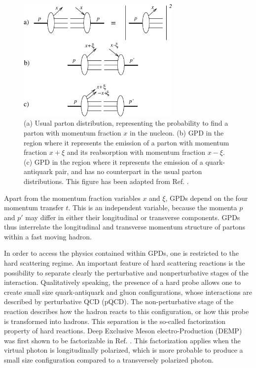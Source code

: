 \documentclass[preprint,superscriptaddress]{revtex4}
\begin{document}
\begin{figure}[hbtp!]
\includegraphics[height=6cm]{pdist_gpd_comparo.eps}
\caption{\label{fig:pdis_gpd_comparo}
(a) Usual parton distribution, representing the probability to find a parton
with momentum fraction $x$ in the nucleon.
(b) GPD in the region where it represents the emission of a parton with
momentum fraction $x+\xi$ and its reabsorption with momentum fraction $x-\xi$.
(c) GPD in the region where it represents the emission of a quark-antiquark
pair, and has no counterpart in the usual parton distributions.
This figure has been adapted from Ref. \cite{Di00}.
}
\end{figure}

Apart from the momentum fraction variables $x$ and $\xi$, GPDs depend on the
four momentum transfer $t$.  This is an independent variable, because the
momenta $p$ and $p'$ may differ in either their longitudinal or transverse
components.  GPDs thus interrelate the longitudinal and transverse momentum
structure of partons within a fast moving hadron.

In order to access the physics contained within GPDs, one is restricted to the
hard scattering regime.  An important feature of hard scattering reactions is
the possibility to separate clearly the perturbative and nonperturbative stages
of the interaction.  Qualitatively speaking, the presence of a hard probe
allows one to create small size quark-antiquark and gluon configurations, whose
interactions are described by perturbative QCD (pQCD).  The non-perturbative
stage of the reaction describes how the hadron reacts to this configuration, or
how this probe is transformed into hadrons.  This separation is the so-called
factorization property of hard reactions.  Deep Exclusive Meson
electro-Production (DEMP) was first shown to be factorizable in
Ref. \cite{Co97}.  This factorization applies when the virtual photon is
longitudinally polarized, which is more probable to produce a small size
configuration compared to a transversely polarized photon.
\end{document}
